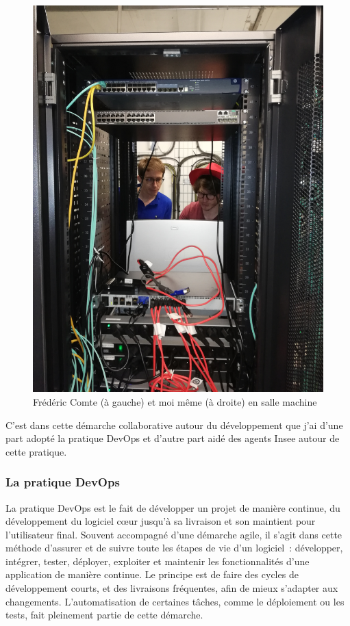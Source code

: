 \begin{figure}[H]
    \centering
    \includegraphics[scale=0.10]{images/salle-machine.jpg}
    \caption{Frédéric Comte (à gauche) et moi même (à droite) en salle machine}
    \label{fig:salle-machine}
\end{figure}
\vspace{10pt}

C'est dans cette démarche collaborative autour du développement que j'ai d'une part adopté la pratique DevOps et d'autre part aidé des agents Insee autour de cette pratique.
\label{section 2.2.2 - Séminaire du développement}

\subsubsection{La pratique DevOps}
La pratique DevOps est le fait de développer un projet de manière continue, du développement du logiciel cœur jusqu'à sa livraison et son maintient pour l'utilisateur final. Souvent accompagné d'une démarche agile, il s'agit dans cette méthode d'assurer et de suivre toute les étapes de vie d'un logiciel~: développer, intégrer, tester, déployer, exploiter et maintenir les fonctionnalités d'une application de manière continue. Le principe est de faire des cycles de développement courts, et des livraisons fréquentes, afin de mieux s'adapter aux changements. L'automatisation de certaines tâches, comme le déploiement ou les tests, fait pleinement partie de cette démarche.
\newline

